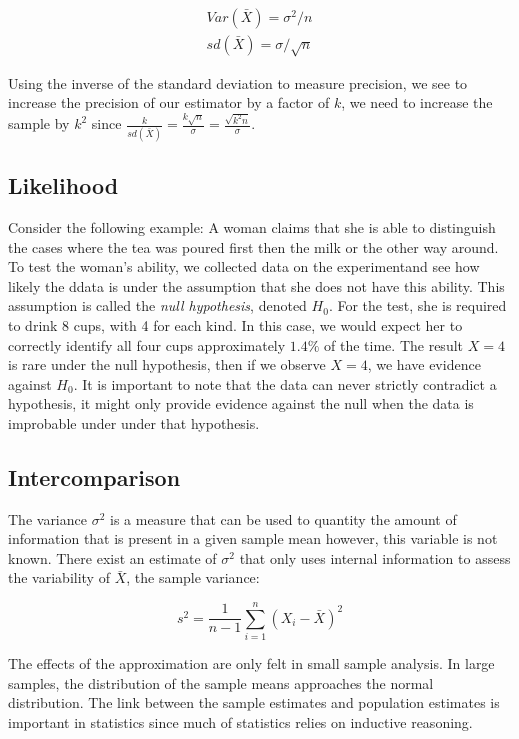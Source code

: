 \documentclass{article}
\begin{document}
$$
    \begin{aligned}
        Var(\bar{X}) = \sigma^{2} / n
        \\
        sd(\bar{X}) = \sigma / \sqrt{n}
    \end{aligned}
$$

Using the inverse of the standard deviation to measure precision, we see to increase
the precision of our estimator by a factor of $k$, we need to increase the sample by
$k^{2}$ since $\frac{k}{sd(\bar{X})} = \frac {k \sqrt{n}}{\sigma} = \frac {\sqrt{k^{2}n}}{\sigma}$.

\subsection{Likelihood}
Consider the following example: A woman claims that she is able to distinguish the
cases where the tea was poured first then the milk or the other way around. To
test the woman's ability, we collected data on the experimentand see how likely
the ddata is under the assumption that she does not have this ability. This
assumption is called the \textit{null hypothesis}, denoted $H_{0}$. For the test,
she is required to drink 8 cups, with 4 for each kind. In this case, we would
expect her to correctly identify all four cups approximately $1.4\%$ of the time.
The result $X = 4$ is rare under the null hypothesis, then if we observe $X = 4$,
we have evidence against $H_{0}$. It is important to note that the data can never strictly contradict a hypothesis,
it might only provide evidence against the null when the data is improbable under
under that hypothesis.

\subsection{Intercomparison}
The variance $\sigma^{2}$ is a measure that can be used to quantity the amount of
information that is present in a given sample mean however, this variable is not known.
There exist an estimate of $\sigma^{2}$ that only uses internal information to assess
the variability of $\bar{X}$, the sample variance:

$$
    s^{2} = \frac{1}{n - 1} \sum_{i = 1}^{n} (X_{i} - \bar{X})^{2}
$$

The effects of the approximation are only felt in small sample analysis. In large
samples, the distribution of the sample means approaches the normal distribution.
The link between the sample estimates and population estimates is important in
statistics since much of statistics relies on inductive reasoning.
\end{document}
